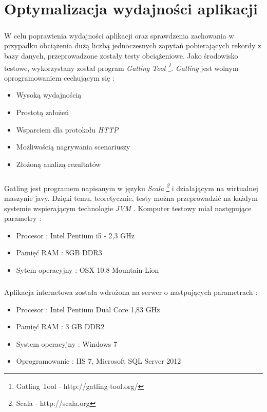 \chapter{Optymalizacja wydajności aplikacji} %
\label{cha:wdra_anie}

\paragraph{} %
\label{par:}
W celu poprawienia wydajności aplikacji oraz sprawdzenia zachowania w przypadku obciążenia dużą liczbą jednoczesnych zapytań pobierających rekordy z bazy danych, przeprowadzone zostały testy obciążeniowe. Jako środowisko testowe, wykorzystany został program \textit{Gatling Tool \footnote{Gatling Tool - http://gatling-tool.org/}}. \textit{Gatling} jest wolnym oprogramowaniem cechującym się :
\begin{itemize}
 	\item Wysoką wydajnością
 	\item Prostotą założeń
 	\item Wsparciem dla protokołu \textit{HTTP}
 	\item Możliwością nagrywania scenariuszy
 	\item Złożoną analizą rezultatów
 \end{itemize} 

\paragraph{} %
\label{par:}
Gatling jest programem napisanym w języku \textit{Scala \footnote{Scala - http://scala.org}} i działającym na wirtualnej maszynie javy. Dzięki temu, teoretycznie, testy można przeprowadzić na każdym systemie wspierającym technologie \textit{JVM} . Komputer testowy miał następujące parametry :
\begin{itemize}
	\item Procesor : Intel Pentium i5 - 2,3 GHz
	\item Pamięć RAM : 8GB DDR3
	\item Sytem operacyjny : OSX 10.8 Mountain Lion
\end{itemize}

\paragraph{} %
 \label{par:}
 Aplikacja internetowa została wdrożona na serwer o nastpujących parametrach :
 \begin{itemize}
 	\item Procesor : Intel Pentium Dual Core 1,83 GHz
 	\item Pamięć RAM : 3 GB DDR2
 	\item System operacyjny : Windows 7
 	\item Oprogramowanie : IIS 7, Microsoft SQL Server 2012
 \end{itemize}


